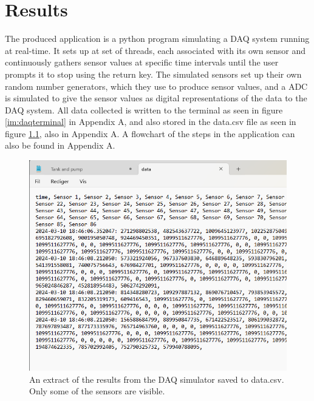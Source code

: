 \documentclass[12pt, A4paper, english]{book}
\begin{document}
	\chapter{Results}
The produced application is a python program simulating a DAQ system running at real-time. It sets up at set of threads, each associated with its own sensor and continuously gathers sensor values at specific time intervals until the user prompts it to stop using the return key. The simulated sensors set up their own random number generators, which they use to produce sensor values, and a ADC is simulated to give the sensor values as digital representations of the data to the DAQ system. All data collected is written to the terminal as seen in figure \ref{im:daqterminal} in Appendix A, and also stored in the data.csv file as seen in figure \ref{im:csv}, also in Appendix A. A flowchart of the steps in the application can also be found in Appendix A.
		\begin{figure}
\centering
\includegraphics[width=\linewidth]{csv}
\caption{An extract of the results from the DAQ simulator saved to data.csv. Only some of the sensors are visible.}
\label{im:csv}
		\end{figure}
\end{document}
